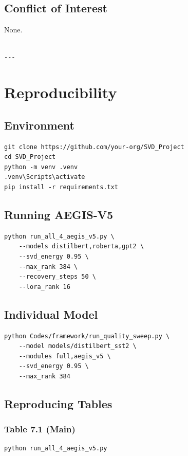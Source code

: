 \subsection{Conflict of Interest}

None.
\begin{lstlisting}

---
\end{lstlisting}

\section{Reproducibility}

\subsection{Environment}

\begin{lstlisting}
git clone https://github.com/your-org/SVD_Project
cd SVD_Project
python -m venv .venv
.venv\Scripts\activate
pip install -r requirements.txt
\end{lstlisting}

\subsection{Running AEGIS-V5}

\begin{lstlisting}
python run_all_4_aegis_v5.py \
    --models distilbert,roberta,gpt2 \
    --svd_energy 0.95 \
    --max_rank 384 \
    --recovery_steps 50 \
    --lora_rank 16
\end{lstlisting}

\subsection{Individual Model}

\begin{lstlisting}
python Codes/framework/run_quality_sweep.py \
    --model models/distilbert_sst2 \
    --modules full,aegis_v5 \
    --svd_energy 0.95 \
    --max_rank 384
\end{lstlisting}

\subsection{Reproducing Tables}

\subsubsection{Table 7.1 (Main)}
\begin{lstlisting}
python run_all_4_aegis_v5.py
\end{lstlisting}

